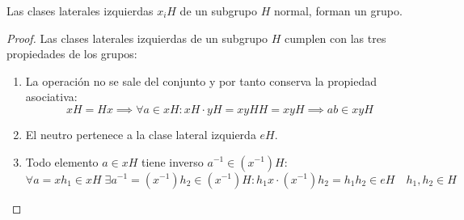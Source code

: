 \begin{thm}
    Las clases laterales izquierdas $x_iH$ de un subgrupo $H$ normal, forman un grupo.
\end{thm}

\begin{proof}
    Las clases laterales izquierdas de un subgrupo $H$ cumplen con las tres propiedades de los grupos:
    \begin{enumerate}
        \item La operación no se sale del conjunto y por tanto conserva la propiedad asociativa:
            \begin{equation}
                xH = Hx \implies \forall a \in xH : xH \cdot yH = xyHH = xyH \implies ab \in xyH
            \end{equation}
        \item El neutro pertenece a la clase lateral izquierda $eH$.
        \item Todo elemento $a \in xH$ tiene inverso $a^{-1} \in (x^{-1})H$:
            \begin{equation}
                \forall a = xh_{1} \in xH \; \exists a^{-1} = (x^{-1})h_{2}  \in (x^{-1})H : h_{1}x \cdot (x^{-1})h_2 = h_{1}h_{2} \in eH \quad h_{1},h_{2} \in H
            \end{equation}
    \end{enumerate}
\end{proof}
